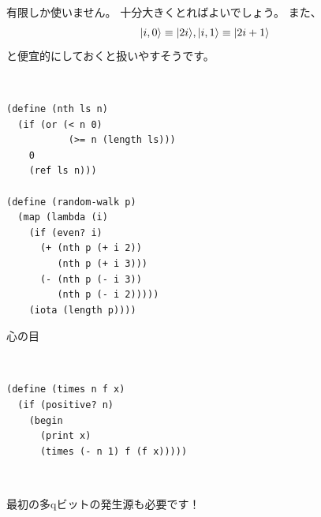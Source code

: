 




\hline
\begin{minipage}{.01\hsize}
  ~
\end{minipage}
\begin{minipage}{.39\hsize}
  有限しか使いません。
  十分大きくとればよいでしょう。
  また、
  $$| i, 0 \rangle \equiv | 2i \rangle, | i,1 \rangle \equiv | 2i+1 \rangle$$
  と便宜的にしておくと扱いやすそうです。
\end{minipage}
\begin{minipage}{.10\hsize}
  ~
\end{minipage}
\begin{minipage}{.39\hsize}
  \begin{verbatim}
(define (nth ls n)
  (if (or (< n 0)
           (>= n (length ls)))
    0
    (ref ls n)))

(define (random-walk p)
  (map (lambda (i)
    (if (even? i)
      (+ (nth p (+ i 2))
         (nth p (+ i 3)))
      (- (nth p (- i 3))
         (nth p (- i 2)))))
    (iota (length p))))
  \end{verbatim}
\end{minipage}


{心の目}



\hline
\begin{minipage}{.01\hsize}
  ~
\end{minipage}
\begin{minipage}{.39\hsize}
  \begin{verbatim}
(define (times n f x)
  (if (positive? n)
    (begin
      (print x)
      (times (- n 1) f (f x)))))
  \end{verbatim}
\end{minipage}
\begin{minipage}{.10\hsize}
  ~
\end{minipage}
\begin{minipage}{.39\hsize}
  最初の多qビットの発生源も必要です！
\end{minipage}



